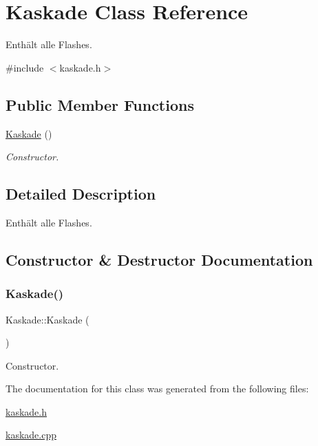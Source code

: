 \hypertarget{class_kaskade}{}\section{Kaskade Class Reference}
\label{class_kaskade}


Enthält alle Flashes.  




{\ttfamily \#include $<$kaskade.\+h$>$}

\subsection*{Public Member Functions}
\begin{DoxyCompactItemize}
\item 
\mbox{\hyperlink{class_kaskade_aaefab1469c1c00d88709cffda4aa9690}{Kaskade}} ()
\begin{DoxyCompactList}\small\item\em Constructor. \end{DoxyCompactList}\end{DoxyCompactItemize}


\subsection{Detailed Description}
Enthält alle Flashes. 

\subsection{Constructor \& Destructor Documentation}
\mbox{\label{class_kaskade_aaefab1469c1c00d88709cffda4aa9690}} 
\subsubsection{\texorpdfstring{Kaskade()}{Kaskade()}}
{\footnotesize\ttfamily Kaskade\+::\+Kaskade (\begin{DoxyParamCaption}{ }\end{DoxyParamCaption})}



Constructor. 



The documentation for this class was generated from the following files\+:\begin{DoxyCompactItemize}
\item 
\mbox{\hyperlink{kaskade_8h}{kaskade.\+h}}\item 
\mbox{\hyperlink{kaskade_8cpp}{kaskade.\+cpp}}\end{DoxyCompactItemize}
